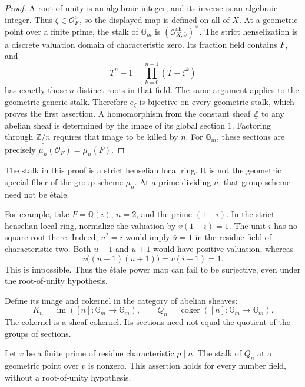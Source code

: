 \begin{proof}
A root of unity is an algebraic integer, and its inverse is an algebraic
integer.  Thus \(\zeta\in\mathcal O_F^\times\), so the displayed map
is defined on all of \(X\).  At a geometric point over a finite prime,
the stalk of \(\mathbb G_m\) is
\((\mathcal O_{X,\bar x}^{\mathrm{sh}})^\times\).
The strict henselization is a discrete valuation domain of characteristic
zero.  Its fraction field contains \(F\), and
\[
 T^n-1=\prod_{k=0}^{n-1}(T-\zeta^k)
\]
has exactly those \(n\) distinct roots in that field.  The same argument
applies to the geometric generic stalk.  Therefore \(e_\zeta\) is
bijective on every geometric stalk, which proves the first assertion.
A homomorphism from the constant sheaf \(\underline{\mathbb Z}\) to
any abelian sheaf is determined by the image of its global section \(1\).
Factoring through \(\underline{\mathbb Z/n}\) requires that image to be
killed by \(n\).  For \(\mathbb G_m\), these sections are precisely
\(\mu_n(\mathcal O_F)=\mu_n(F)\).
\end{proof}

The stalk in this proof is a strict henselian local ring.  It is not the
geometric special fiber of the group scheme \(\mu_n\).  At a prime
dividing \(n\), that group scheme need not be \'etale.

For example, take \(F=\mathbb Q(i)\), \(n=2\), and the prime
\((1-i)\).  In the strict henselian local ring, normalize the valuation
by \(v(1-i)=1\).  The unit \(i\) has no square root there.  Indeed,
\(u^2=i\) would imply \(\bar u=1\) in the residue field of
characteristic two.  Both \(u-1\) and \(u+1\) would have positive
valuation, whereas
\[
  v\bigl((u-1)(u+1)\bigr)=v(i-1)=1.
\]
This is impossible.  Thus the \'etale power map can fail to be surjective,
even under the root-of-unity hypothesis.

Define its image and cokernel in the category of abelian sheaves:
\[
 K_n=\operatorname{im}([n]:\mathbb G_m\to\mathbb G_m),
 \qquad Q_n=\operatorname{coker}([n]:\mathbb G_m\to\mathbb G_m).
\]
The cokernel is a sheaf cokernel.  Its sections need not equal the quotient
of the groups of sections.

\begin{lemma}
\label{lem:coefficient-prime-defect}
Let \(v\) be a finite prime of residue characteristic \(p\mid n\).
The stalk of \(Q_n\) at a geometric point over \(v\) is nonzero.
This assertion holds for every number field, without a root-of-unity
hypothesis.
\end{lemma}

